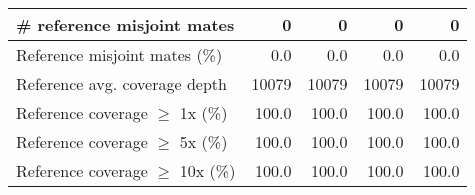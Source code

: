 \documentclass[12pt,a4paper]{article}
\begin{document}
\begin{table}[ht]
\begin{center}
\begin{tabular}{|l*{4}{|r}|}
\# reference misjoint mates & 0 & 0 & 0 & 0 \\ \hline
Reference misjoint mates (\%) & 0.0 & 0.0 & 0.0 & 0.0 \\ \hline
Reference avg. coverage depth & 10079 & 10079 & 10079 & 10079 \\ \hline
Reference coverage $\geq$ 1x (\%) & 100.0 & 100.0 & 100.0 & 100.0 \\ \hline
Reference coverage $\geq$ 5x (\%) & 100.0 & 100.0 & 100.0 & 100.0 \\ \hline
Reference coverage $\geq$ 10x (\%) & 100.0 & 100.0 & 100.0 & 100.0 \\ \hline
\end{tabular}
\end{center}
\end{table}
\end{document}
